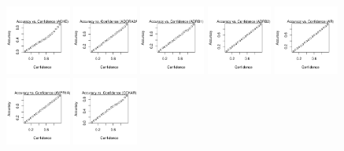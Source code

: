 \documentclass[10pt,article]{memoir}
\begin{document}
\begin{figure}[h!]
\includegraphics[width=0.19\textwidth]{figures/calibration_plots/ache_calib.pdf}
\includegraphics[width=0.19\textwidth]{figures/calibration_plots/adora2a_calib.pdf}
\includegraphics[width=0.19\textwidth]{figures/calibration_plots/adrb1_calib.pdf}
\includegraphics[width=0.19\textwidth]{figures/calibration_plots/adrb2_calib.pdf}
\includegraphics[width=0.19\textwidth]{figures/calibration_plots/ar_calib.pdf}
\includegraphics[width=0.19\textwidth]{figures/calibration_plots/avpr1a_calib.pdf}
\includegraphics[width=0.19\textwidth]{figures/calibration_plots/cckar_calib.pdf}

\end{figure}
\end{document}
